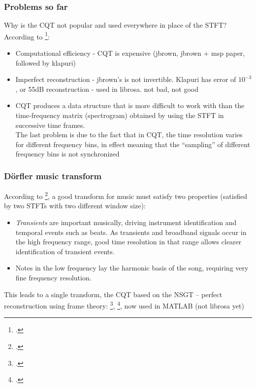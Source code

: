 \documentclass[usenames,dvipsnames]{beamer}
\begin{document}
\begin{frame}
	\frametitle{Problems so far}
	Why is the CQT not popular and used everywhere in place of the STFT? According to \footcite{cqtklapuri}:
	\begin{itemize}
		\item
			Computational efficiency - CQT is expensive (jbrown, jbrown + msp paper, followed by klapuri)
		\item
			Imperfect reconstruction - jbrown's is not invertible. Klapuri has error of $10^{-3}$, or 55dB reconstruction - used in librosa. not bad, not good
		\item
			CQT produces a data structure that is more difficult to work with than the time-frequency matrix (spectrogram) obtained by using the STFT in successive time frames.\\
			The last problem is due to the fact that in CQT, the time resolution varies for different frequency bins, in effect meaning that the ``sampling'' of different frequency bins is not synchronized
	\end{itemize}
\end{frame}

\begin{frame}
	\frametitle{D{\"o}rfler music transform}
	According to \footcite{doerflerphd}, a good transform for music must satisfy two properties (satisfied by two STFTs with two different window size):
\begin{itemize}
	\item
		\textit{Transients} are important musically, driving instrument identification and temporal events such as beats. As transients and broadband signals occur in the high frequency range, good time resolution in that range allows clearer identification of transient events.
	\item
		 Notes in the low frequency lay the harmonic basis of the song, requiring very fine frequency resolution.
\end{itemize}
	This leads to a single transform, the CQT based on the NSGT -- perfect reconstruction using frame theory: \footcite{balazs}, \footcite{invertiblecqt}, now used in MATLAB (not librosa yet)
\end{frame}
\end{document}
